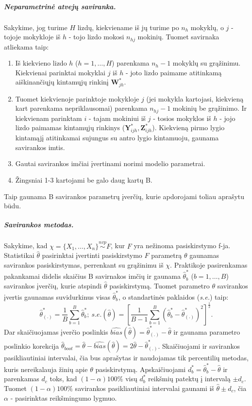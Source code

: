 \documentclass[12pt,a4paper]{article}
\begin{document}
\subparagraph{Neparametrinė atvejų saviranka.} Sakykime, jog turime $H$ lizdų, kiekviename iš jų turime po $n_h$ mokyklų, o $j$ - tojoje mokykloje iš $h$ - tojo lizdo mokosi $n_{hj}$ mokinių. Tuomet savirnaka atliekama taip:
\begin{enumerate}
\item Iš kiekvieno lizdo $h$ ($h=1,\dots,H$) parenkama $n_h-1$ mokyklų su grąžinimu. Kiekvienai parinktai mokyklai $j$ iš $h$ - joto lizdo paimame atitinkamą aiškinančiųjų kintamųjų rinkinį $\mathbf{W}^*_{jh}$.
\item Tuomet kiekvienoje parinktoje mokykloje $j$ (jei mokykla kartojasi, kiekvieną kart parenkama nepriklausomai) parenkama $n_{hj}-1$ mokinių be grąžinimo. Ir kiekvienam parinktam $i$ - tajam mokiniui iš $j$ - tosios mokyklos iš $h$ - jojo lizdo paimamas kintamųjų rinkinys ($\mathbf{Y}^*_{ijh}, \mathbf{Z}^*_{ijh}$). Kiekvieną pirmo lygio kintamąjį atitinkamai sujungus su antro lygio kintamuoju, gaunama savirankos imtis.
\item Gautai savirankos imčiai įvertinami norimi modelio parametrai.
\item Žingsniai 1-3 kartojami be galo daug kartų B.
\end{enumerate}
Taip gaunama B savirankos parametrų įverčių, kurie apdorojami toliau aprašytu būdu.

\subparagraph{Savirankos metodas.} Sakykime, kad $\chi = \{X_1,\dots,X_n\}\stackrel{nvp}{\sim}F$, kur $F$ yra nežinoma pasiskirstymo f-ja. Statistikai $\hat{\theta}$ pasirinktai įvertinti pasiskirstymo $F$ parametrą $\theta$ gaunamas savirankos pasiskirstymas, perrenkant su grąžinimu iš $\chi$. Praktikoje pasirenkamas pakankamai didelis skaičius B savirnakos imčių ir gaunama $\hat{\theta}^*_b$ ($b=1,\dots,B$) savirankos įverčių, kurie atspindi $\hat{\theta}$ pasiskirstymą. Tuomet parametro $\theta$ savirankos įvertis gaunamas suvidurkinus visas $\hat{\theta}^*_b$, o standartinės paklaidos (\textit{s.e.}) taip:
\[
\hat{\theta}^*_{(.)}=\frac{1}{B}\sum^B_{b=1}\hat{\theta}^*_b; \
s.e.(\hat{\theta})=\left[\frac{1}{B-1}\sum^B_{b=1}(\hat{\theta}^*_b - \hat{\theta}^*_{(.)})^2\right]^{\frac{1}{2}}.
\]
Dar skaičiuojamas įverčio poslinkis $\widehat{bias}(\hat{\theta})=\hat{\theta}^*_{(.)}-\hat{\theta}$ ir gaunama parametro poslinkio korekcija $\hat{\theta}_{boot}=\hat{\theta}-\widehat{bias}(\hat{\theta})=2\hat{\theta}-\hat{\theta}^*_{(.)}$. Skaičiuojami ir savirankos pasikliautiniai intervalai, čia bus aprašytas ir naudojamas tik percentilių metodas, kuris nereikalauja žinių apie $\theta$ pasiskirstymą. Apskaičiuojami $d^*_b=\hat{\theta}^*_b-\hat{\theta}$ ir parenkamas $d_c$ toks, kad $(1-\alpha)100\%$ visų $d^*_b$ reikšmių patektų į intervalą $\pm d_c$. Tuomet $(1-\alpha)100\%$ savirankos pasikliautiniai intervalai gaunami iš $\hat{\theta}\pm d_c$, čia $\alpha$ - pasirinktas reikšmingumo lygmuo.
\end{document}
